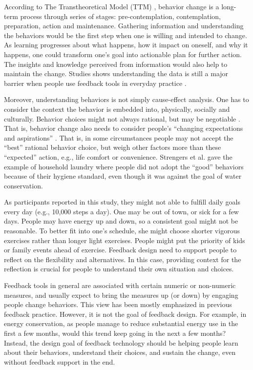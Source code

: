 \documentclass[12pt,oneside]{book}
\begin{document}
According to The Transtheoretical Model (TTM) \cite{prochaska_transtheoretical_1997}, behavior change is a long-term process through series of stages: pre-contemplation, contemplation, preparation, action and maintenance.
Gathering information and understanding the behaviors would be the first step when one is willing and intended to change. As learning progresses about what happens, how it impact on oneself, and why it happens, one could transform one's goal into actionable plan for further action. The insights and knowledge perceived from information would also help to maintain the change. Studies shows understanding the data is still a major barrier when people use feedback tools in everyday practice \cite{bartram_design_2015,strengers_designing_2011,neustaedter_everyday_2013}.

Moreover, understanding behaviors is not simply cause-effect analysis. One has to consider the context the behavior is embedded into, physically, socially and culturally. Behavior choices might not always rational, but may be negotiable \cite{strengers_designing_2011, pierce_consideration_2010}. That is, behavior change also needs to consider people's ``changing expectations and aspirations'' \cite{strengers_designing_2011}. That is, in some circumstances people may not accept the ``best'' rational behavior choice, but weigh other factors more than these ``expected'' action, e.g., life comfort or convenience. Strengers et al.\cite{strengers_designing_2011} gave the example of household laundry where people did not adopt the ``good'' behaviors because of their hygiene standard, even though it was against the goal of water conservation.  

As participants reported in this study, they might not able to fulfill daily goals every day (e.g., 10,000 steps a day). One may be out of town, or sick for a few days. People may have energy up and down, so a consistent goal might not be reasonable. To better fit into one's schedule, she might choose shorter vigorous exercises rather than longer light exercises. People might put the priority of kids or family events ahead of exercise. Feedback design need to support people to reflect on the flexibility and alternatives. In this case, providing context for the reflection is crucial for people to understand their own situation and choices.

Feedback tools in general are associated with certain numeric or non-numeric measures, and usually expect to bring the measures up (or down) by engaging people change behaviors. This view has been mostly emphasized in previous feedback practice. However, it is not the goal of feedback design. For example, in energy conservation, as people manage to reduce substantial energy use in the first a few months, would this trend keep going in the next a few months?  Instead, the design goal of feedback technology should be helping people learn about their behaviors, understand their choices, and sustain the change, even without feedback support in the end.
\end{document}
